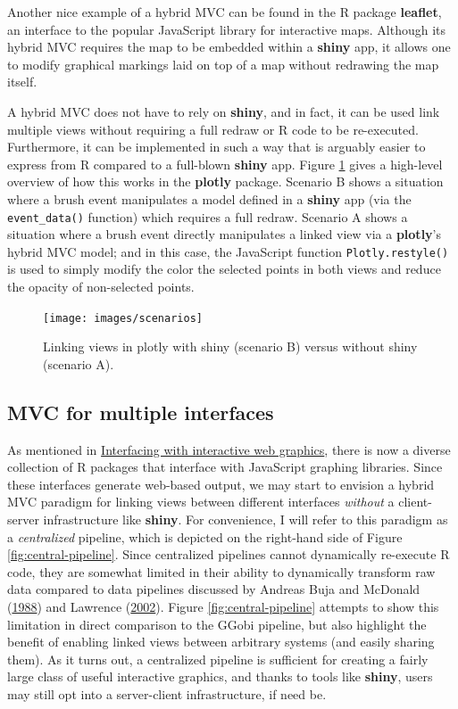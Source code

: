 \documentclass[12pt,]{isuthesis}
\begin{document}
Another nice example of a hybrid MVC can be found in the R package
\textbf{leaflet}, an interface to the popular JavaScript library for
interactive maps. Although its hybrid MVC requires the map to be
embedded within a \textbf{shiny} app, it allows one to modify graphical
markings laid on top of a map without redrawing the map itself.

A hybrid MVC does not have to rely on \textbf{shiny}, and in fact, it
can be used link multiple views without requiring a full redraw or R
code to be re-executed. Furthermore, it can be implemented in such a way
that is arguably easier to express from R compared to a full-blown
\textbf{shiny} app. Figure \ref{fig:scenarios} gives a high-level
overview of how this works in the \textbf{plotly} package. Scenario B
shows a situation where a brush event manipulates a model defined in a
\textbf{shiny} app (via the \texttt{event\_data()} function) which
requires a full redraw. Scenario A shows a situation where a brush event
directly manipulates a linked view via a \textbf{plotly}'s hybrid MVC
model; and in this case, the JavaScript function
\texttt{Plotly.restyle()} is used to simply modify the color the
selected points in both views and reduce the opacity of non-selected
points.

\begin{figure}
\centering
\texttt{[image: images/scenarios]}
\caption{\label{fig:scenarios}Linking views in plotly with shiny (scenario
B) versus without shiny (scenario A).}
\end{figure}

\subsection{MVC for multiple
interfaces}\label{mvc-for-multiple-interfaces}

As mentioned in
\protect\hyperlink{interfacing-with-interactive-web-graphics}{Interfacing
with interactive web graphics}, there is now a diverse collection of R
packages that interface with JavaScript graphing libraries. Since these
interfaces generate web-based output, we may start to envision a hybrid
MVC paradigm for linking views between different interfaces
\emph{without} a client-server infrastructure like \textbf{shiny}. For
convenience, I will refer to this paradigm as a \emph{centralized}
pipeline, which is depicted on the right-hand side of Figure
\ref{fig:central-pipeline}. Since centralized pipelines cannot
dynamically re-execute R code, they are somewhat limited in their
ability to dynamically transform raw data compared to data pipelines
discussed by Andreas Buja and McDonald
(\protect\hyperlink{ref-viewing-pipeline}{1988}) and Lawrence
(\protect\hyperlink{ref-ggobi-pipeline-design}{2002}). Figure
\ref{fig:central-pipeline} attempts to show this limitation in direct
comparison to the GGobi pipeline, but also highlight the benefit of
enabling linked views between arbitrary systems (and easily sharing
them). As it turns out, a centralized pipeline is sufficient for
creating a fairly large class of useful interactive graphics, and thanks
to tools like \textbf{shiny}, users may still opt into a server-client
infrastructure, if need be.
\end{document}
